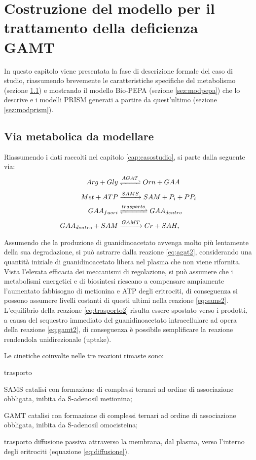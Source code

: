 \chapter{Costruzione del modello per il trattamento della deficienza GAMT}\label{cap:costruzione}
In questo capitolo viene presentata la fase di descrizione formale del caso di studio, riassumendo brevemente le caratteristiche specifiche del metabolismo (sezione \ref{sez:via}) e mostrando il modello Bio-PEPA (sezione \ref{sez:modpepa}) che lo descrive e i modelli PRISM generati a partire da quest'ultimo (sezione \ref{sez:modprism}).

\section{Via metabolica da modellare}\label{sez:via}
Riassumendo i dati raccolti nel capitolo \ref{cap:casostudio}, si parte dalla seguente via:
\begin{align}
		Arg + Gly &\xrightleftharpoons{AGAT} Orn + GAA\label{eq:agat2}\\
		Met + ATP &\xrightarrow{SAMS} SAM + P_i + PP_i\label{eq:sams2}\\
		GAA_{fuori} &\xrightleftharpoons{trasporto} GAA_{dentro}\label{eq:trasporto2}\\
		GAA_{dentro} + SAM &\xrightarrow{GAMT} Cr + SAH,\label{eq:gamt2}
\end{align}

Assumendo che la produzione di guanidinoacetato avvenga molto pi\`u lentamente della sua degradazione, si pu\`o astrarre dalla reazione \ref{eq:agat2}, considerando una quantit\`a iniziale di guanidinoacetato libera nel plasma che non viene rifornita.
Vista l'elevata efficacia dei meccanismi di regolazione, si pu\`o assumere che i metabolismi energetici e di biosintesi riescano a compensare ampiamente l'aumentato fabbisogno di metionina e ATP degli eritrociti, di conseguenza si possono assumere livelli costanti di questi ultimi nella reazione \ref{eq:sams2}.
L'equilibrio della reazione \ref{eq:trasporto2} risulta essere spostato verso i prodotti, a causa del sequestro immediato del guanidinoacetato intracellulare ad opera della reazione \ref{eq:gamt2}, di conseguenza \`e possibile semplificare la reazione rendendola unidirezionale (uptake).

Le cinetiche coinvolte nelle tre reazioni rimaste sono:
\begin{labeling}{trasporto}
	\item [SAMS] catalisi con formazione di complessi ternari ad ordine di associazione obbligata, inibita da S-adenosil metionina;
	\item [GAMT] catalisi con formazione di complessi ternari ad ordine di associazione obbligata, inibita da S-adenosil omocisteina;
	\item [trasporto] diffusione passiva attraverso la membrana, dal plasma, verso l'interno degli eritrociti (equazione \ref{eq:diffusione}).
\end{labeling}

